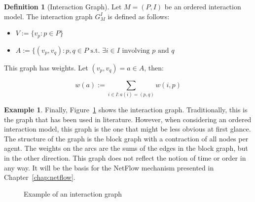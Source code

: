 \documentclass[a4paper,11pt]{book}
\theoremstyle{definition}
\newtheorem{definition}{Definition}
\newtheorem*{example}{Example}
\begin{document}
\begin{definition}[Interaction Graph]
    Let $M = (P, I)$ be an ordered interaction model. The interaction graph $G^I_M$ is defined as follows:

    \begin{itemize}
        \item $V := \{ v_p : p \in P \}$\\
        \item $A := \{ (v_p, v_q) : p, q \in P \mbox{ s.t. } \exists i \in I \mbox{ involving } p \mbox{ and } q$ \\
    \end{itemize}

    This graph has weights. Let $(v_{p}, v_q) = a \in A$, then:

    \begin{equation*}
        w(a) := \sum_{i \in I : a(i) = (p, q)} w(i, p)
    \end{equation*}
\end{definition}

\begin{example}
Finally, Figure~\ref{fig:ex_ig} shows the interaction graph. Traditionally, this is the graph
that has been used in literature. However, when considering an ordered interaction model, this
graph is the one that might be less obvious at first glance. The structure of the graph
is the block graph with a contraction of all nodes per agent. The weights on the arcs are
the sums of the edges in the block graph, but in the other direction. This graph does
not reflect the notion of time or order in any way. It will be the basis for the
NetFlow mechanism presented in Chapter~\ref{chap:netflow}.

\begin{figure}[h]
    \centering
     \caption{Example of an interaction graph}
     \label{fig:ex_ig}
\end{figure}
\end{example}
\end{document}

